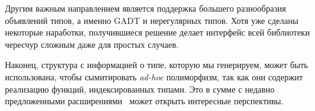 Другим важным направлением является поддержка большего разнообразия объявлений типов, а именно GADT и нерегулярных типов. Хотя уже сделаны некоторые наработки, получившиеся решение делает интерфейс всей библиотеки чересчур сложным даже для простых случаев.

Наконец, структура с информацией о типе, которую мы генерируем, может быть использована, чтобы сымитировать \emph{ad-hoc} полиморфизм, так как они содержит реализацию функций, индексированных типами. Это в сумме с недавно предложенными расширениями~\cite{ModularImplicits} может открыть интересные перспективы.


